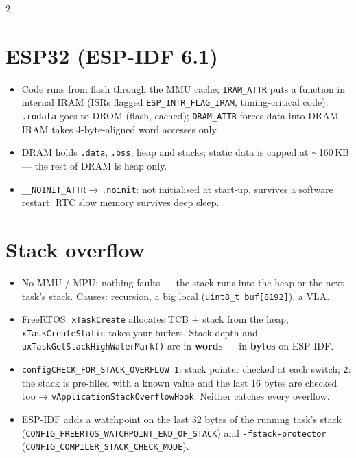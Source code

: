 \documentclass[8pt]{extarticle}
\newcommand\ct[1]{\texttt{#1}}
\begin{document}
\begin{multicols}{2}
\section{ESP32 (ESP-IDF 6.1)}
\begin{itemize}
  \item Code runs from flash through the MMU cache; \ct{IRAM\_ATTR} puts a function in internal
        IRAM (ISRs flagged \ct{ESP\_INTR\_FLAG\_IRAM}, timing-critical code). \ct{.rodata} goes to
        DROM (flash, cached); \ct{DRAM\_ATTR} forces data into DRAM. IRAM takes 4-byte-aligned
        word accesses only.
  \item DRAM holds \ct{.data}, \ct{.bss}, heap and stacks; static data is capped at
        $\sim$160\,KB — the rest of DRAM is heap only.
  \item \ct{\_\_NOINIT\_ATTR} → \ct{.noinit}: not initialised at start-up, survives a software
        restart. RTC slow memory survives deep sleep.
\end{itemize}

\section{Stack overflow}
\begin{itemize}
  \item No MMU / MPU: nothing faults — the stack runs into the heap or the next task's stack.
        Causes: recursion, a big local (\ct{uint8\_t buf[8192]}), a VLA.
  \item FreeRTOS: \ct{xTaskCreate} allocates TCB + stack from the heap,
        \ct{xTaskCreateStatic} takes your buffers. Stack depth and
        \ct{uxTaskGetStackHighWaterMark()} are in \textbf{words} — in \textbf{bytes} on ESP-IDF.
  \item \ct{configCHECK\_FOR\_STACK\_OVERFLOW 1}: stack pointer checked at each switch;
        \ct{2}: the stack is pre-filled with a known value and the last 16 bytes are checked too
        → \ct{vApplicationStackOverflowHook}. Neither catches every overflow.
  \item ESP-IDF adds a watchpoint on the last 32 bytes of the running task's stack
        (\ct{CONFIG\_FREERTOS\_WATCHPOINT\_END\_OF\_STACK}) and \ct{-fstack-protector}
        (\ct{CONFIG\_COMPILER\_STACK\_CHECK\_MODE}).
\end{itemize}


\end{multicols}
\end{document}
